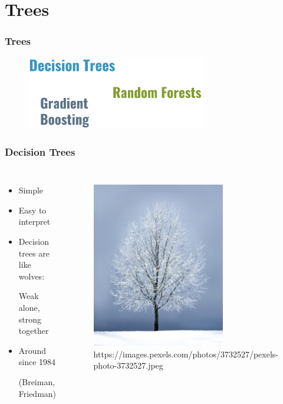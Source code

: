 \documentclass[
    utf8,
    aspectratio=169
]{beamer}  %
\begin{document}
\section{Trees}

\begin{frame}
\frametitle{Trees}
\begin{figure}
	\includegraphics[width=0.7\textwidth]{pics/tree_outline.png}
\end{figure}
\end{frame}

\begin{frame}
\frametitle{Decision Trees}
\begin{columns}[onlytextwidth]
	\begin{itemize}
		\item Simple		
		\item Easy to interpret
		\item Decision trees are like wolves:
		
		Weak alone, strong together
		\item Around since 1984 
		
		(Breiman, Friedman)
	\end{itemize}
	
	\begin{figure}
		\includegraphics[width=0.7\textwidth]{pics/real_tree.jpg}
        \tiny{https://images.pexels.com/photos/3732527/pexels-photo-3732527.jpeg}
	\end{figure}
\end{columns}
\end{frame}
\end{document}
